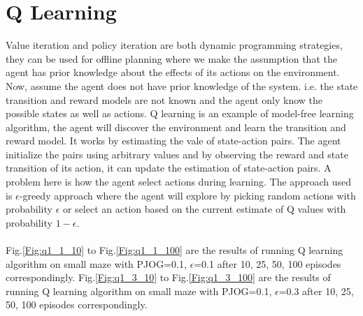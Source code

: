 \documentclass[11pt]{article}
\begin{document}
\section{Q Learning}
Value iteration and policy iteration are both dynamic programming strategies, they can be used for offline planning where we make the assumption that the agent has prior knowledge about the effects of its actions on the environment. Now, assume the agent does not have prior knowledge of the system. i.e. the state transition and reward models are not known and the agent only know the possible states as well as actions.  Q learning is an example of model-free learning algorithm, the agent will discover the environment and learn the transition and reward model. It works by estimating the vale of state-action pairs. The agent initialize the pairs using arbitrary values and by observing the reward and state transition of its action, it can update the estimation of state-action pairs. A problem here is how the agent select actions during learning. The approach used is $\epsilon$-greedy approach where the agent will explore by picking random actions with probability $\epsilon$ or select an action based on the current estimate of Q values with probability $1-\epsilon$.\\
\\
Fig.\ref{Fig:q1_1_10} to Fig.\ref{Fig:q1_1_100} are the results of running Q learning algorithm on small maze with PJOG=0.1, $\epsilon$=0.1 after 10, 25, 50, 100 episodes correspondingly. Fig.\ref{Fig:q1_3_10} to Fig.\ref{Fig:q1_3_100} are the results of running Q learning algorithm on small maze with PJOG=0.1, $\epsilon$=0.3 after 10, 25, 50, 100 episodes correspondingly. 
\end{document}
